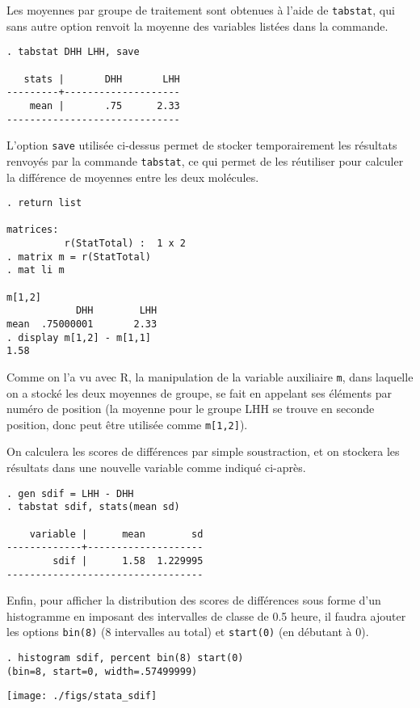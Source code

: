 Les moyennes par groupe de traitement sont obtenues à l'aide de
\texttt{tabstat}, qui sans autre option renvoit la moyenne des variables
listées dans la commande.
\begin{verbatim}
. tabstat DHH LHH, save

   stats |       DHH       LHH
---------+--------------------
    mean |       .75      2.33
------------------------------
\end{verbatim}
L'option \texttt{save} utilisée ci-dessus permet de stocker temporairement
les résultats renvoyés par la commande \texttt{tabstat}, ce qui permet de
les réutiliser pour calculer la différence de moyennes entre les deux
molécules. 
\begin{verbatim}
. return list

matrices:
          r(StatTotal) :  1 x 2
. matrix m = r(StatTotal)
. mat li m

m[1,2]
            DHH        LHH
mean  .75000001       2.33
. display m[1,2] - m[1,1]
1.58
\end{verbatim}
Comme on l'a vu avec R, la manipulation de la variable auxiliaire
\texttt{m}, dans laquelle on a stocké les deux moyennes de groupe, se fait
en appelant ses éléments par numéro de position (la moyenne pour le groupe
LHH se trouve en seconde position, donc peut être utilisée comme
\verb|m[1,2]|). 

On calculera les scores de différences par simple soustraction, et on
stockera les résultats dans une nouvelle variable comme indiqué ci-après.
\begin{verbatim}
. gen sdif = LHH - DHH
. tabstat sdif, stats(mean sd)

    variable |      mean        sd
-------------+--------------------
        sdif |      1.58  1.229995
----------------------------------
\end{verbatim}
Enfin, pour afficher la distribution des scores de différences sous forme
d'un histogramme en imposant des intervalles de classe de 0.5 heure, il
faudra ajouter les options \texttt{bin(8)} (8 intervalles au total) et
\texttt{start(0)} (en débutant à 0).
\begin{verbatim}
. histogram sdif, percent bin(8) start(0)
(bin=8, start=0, width=.57499999)
\end{verbatim}

\texttt{[image: ./figs/stata\_sdif]}

